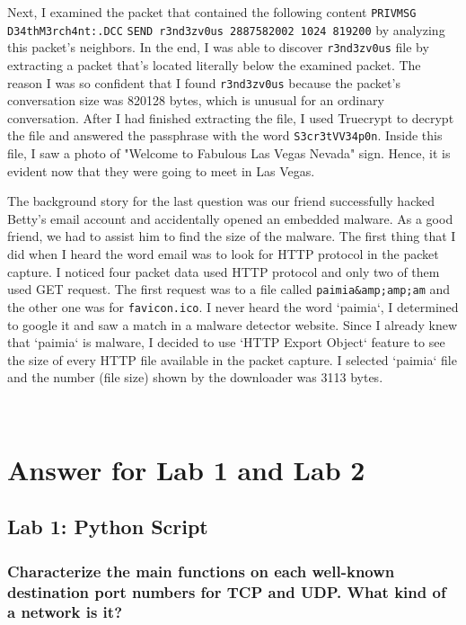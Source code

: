 \documentclass[letterpaper,10pt,titlepage,draftclsnofoot,onecolumn]{IEEEtran}
\begin{document}
Next, I examined the packet that contained the following content \verb|PRIVMSG D34thM3rch4nt:.DCC| \verb|SEND r3nd3zv0us 2887582002 1024 819200| by analyzing this packet's neighbors.
In the end, I was able to discover \verb|r3nd3zv0us| file by extracting a packet that's located literally below the examined packet. 
The reason I was so confident that I found \verb|r3nd3zv0us| because the packet's conversation size was 820128 bytes, which is unusual for an ordinary conversation.
After I had finished extracting the file, I used Truecrypt to decrypt the file and answered the passphrase with the word \verb|S3cr3tVV34p0n|. 
Inside this file, I saw a photo of "Welcome to Fabulous Las Vegas Nevada" sign. 
Hence, it is evident now that they were going to meet in Las Vegas.

The background story for the last question was our friend successfully hacked Betty's email account and accidentally opened an embedded malware. 
As a good friend, we had to assist him to find the size of the malware.
The first thing that I did when I heard the word email was to look for HTTP protocol in the packet capture.
I noticed four packet data used HTTP protocol and only two of them used GET request. 
The first request was to a file called \verb|paimia&amp;amp;am| and the other one was for \verb|favicon.ico|. 
I never heard the word `paimia`, I determined to google it and saw a match in a malware detector website. 
Since I already knew that `paimia` is malware, I decided to use `HTTP Export Object` feature to see the size of every HTTP file available in the packet capture.  
I selected `paimia` file and the number (file size) shown by the downloader was 3113 bytes.

\hfill\\
\section{Answer for Lab 1 and Lab 2}

\subsection{Lab 1: Python Script}

\subsubsection{Characterize the main functions on each well-known destination port numbers for TCP and UDP. What kind of a network is it?}
\hfill\\
\end{document}
